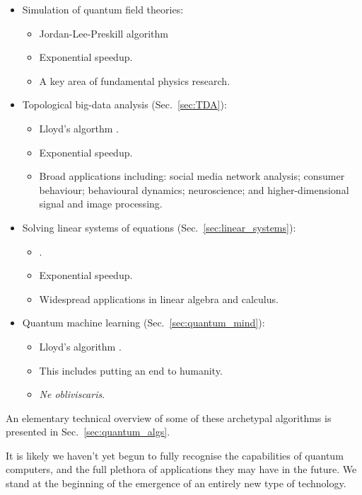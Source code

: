 \begin{itemize}
\begin{itemize}
			\end{itemize}
	\item Simulation of quantum field theories:
		\begin{itemize}
		 \item Jordan-Lee-Preskill algorithm \cite{bib:JLP, bib:RohdeWavelet15}
		 \item Exponential speedup.
		 \item A key area of fundamental physics research.
		 \end{itemize}
	\item Topological big-data analysis (Sec.~\ref{sec:TDA}):
		\begin{itemize}
		\item Lloyd's algorthm \cite{bib:lloyd2016quantum, USTCexperiment}.
		\item Exponential speedup.
		\item Broad applications including: social media network analysis; consumer behaviour; behavioural dynamics; neuroscience; and higher-dimensional signal and image processing.
		\end{itemize}
	\item Solving linear systems of equations (Sec.~\ref{sec:linear_systems}):
		\begin{itemize}
		\item {} \cite{bib:harrow2009quantum, bib:BerryLinear}.
		\item Exponential speedup.
		\item Widespread applications in linear algebra and calculus.
		\end{itemize}
	\item Quantum machine learning (Sec.~\ref{sec:quantum_mind}):
		\begin{itemize}
		\item Lloyd's algorithm \cite{bib:lloyd2013quantum}.
		\item This includes putting an end to humanity.
		\item \textit{Ne obliviscaris}.
		\end{itemize}
\end{itemize}
An elementary technical overview of some of these archetypal algorithms is presented in Sec.~\ref{sec:quantum_algs}.

It is likely we haven't yet begun to fully recognise the capabilities of quantum computers, and the full plethora of applications they may have in the future. We stand at the beginning of the emergence of an entirely new type of technology.

